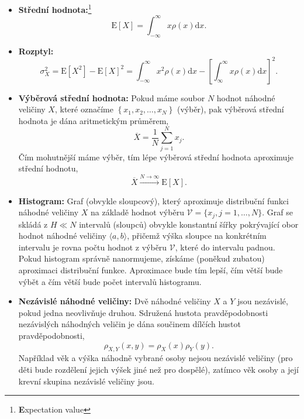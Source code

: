 \documentclass[a4paper,11pt,twoside]{article}
\renewcommand{\d}{\mathrm{d}}           %
\def\expectation#1{\mathrm{E}\left[#1\right]}
\def\dispersion#1{\sigma_{#1}^{2}}
\theoremstyle{red}
\theoremstyle{green}
\begin{document}
\begin{itemize}
            \item {\bf Střední hodnota:}\footnote{{\bf E}xpectation value}
                \begin{equation}
                    \label{eq:Expectation}
                    \expectation{X}=\int_{-\infty}^{\infty}x\rho(x)\d x.
                \end{equation}

            \item {\bf Rozptyl:}
                \begin{equation}
                    \label{eq:Dispersion}
                    \dispersion{X}
                        =\expectation{X^{2}}-\expectation{X}^{2}
                        =\int_{-\infty}^{\infty}x^{2}\rho(x)\d x-\left[\int_{\infty}^{\infty}x\rho(x)\d x\right]^{2}.
                \end{equation}

            \item {\bf Výběrová střední hodnota:} 
                Pokud máme soubor $N$ hodnot náhodné veličiny $X$, které označíme $\left\{x_{1},x_{2},\dotsc,x_{N}\right\}$ (výběr), pak výběrová střední hodnota je dána aritmetickým průměrem,
                \begin{equation}
                    \overline{X}=\frac{1}{N}\sum_{j=1}^{N}x_{j}.
                \end{equation}
                Čím mohutnější máme výběr, tím lépe výběrová střední hodnota aproximuje střední hodnotu,
                \begin{equation}
                    \overline{X}\xrightarrow{N\rightarrow\infty}\expectation{X}.
                \end{equation}

            \item {\bf Histogram:}
                Graf (obvykle sloupcový), který aproximuje distribuční funkci náhodné veličiny $X$ na základě hodnot výběru $\mathcal{V}=\{x_{j},j=1,\dotsc,N\}$.
                Graf se skládá z $H\ll N$ intervalů (sloupců) obvykle konstantní šířky pokrývající obor hodnot náhodné veličiny $\langle a,b\rangle$, přičemž výška sloupce na konkrétním intervalu je rovna počtu hodnot z výběru $\mathcal{V}$, které do intervalu padnou.
                Pokud histogram správně nanormujeme, získáme (poněkud zubatou) aproximaci distribuční funkce.
                Aproximace bude tím lepší, čím větší bude výbět a čím větší bude počet intervalů histogramu.

            \item{\bf Nezávislé náhodné veličiny:}
                Dvě náhodné veličiny $X$ a $Y$ jsou nezávislé, pokud jedna neovlivňuje druhou.
                Sdružená hustota pravděpodobnosti nezávislých náhodných veličin je dána součinem dílčích hustot pravděpodobnosti,
                \begin{equation}
                    \rho_{X,Y}(x,y)=\rho_{X}(x)\rho_{Y}(y).
                \end{equation}
                Například věk a výška náhodně vybrané osoby nejsou nezávislé veličiny (pro děti bude rozdělení jejich výšek jiné než pro dospělé), zatímco věk osoby a její krevní skupina nezávislé veličiny jsou.


\end{itemize}
\end{document}
